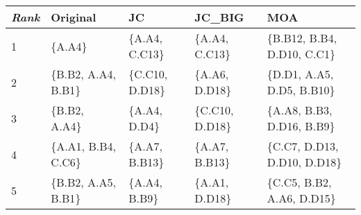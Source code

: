 \begin{tabular}{lllll}
	\toprule
	\textit{Rank} & Original             & JC               & JC\_BIG          & MOA                           \\
	\midrule
	1             & \{A.A4\}             & \{A.A4, C.C13\}  & \{A.A4, C.C13\}  &
	\{B.B12, B.B4, D.D10, C.C1\}                                                                               \\[3pt]
	2             & \{B.B2, A.A4, B.B1\} & \{C.C10, D.D18\} & \{A.A6, D.D18\}  & \{D.D1, A.A5, D.D5, B.B10\}   \\[3pt]
	3             & \{B.B2, A.A4\}       & \{A.A4, D.D4\}   & \{C.C10, D.D18\} & \{A.A8, B.B3, D.D16, B.B9\}   \\[3pt]
	4             & \{A.A1, B.B4, C.C6\} & \{A.A7, B.B13\}  & \{A.A7, B.B13\}  & \{C.C7, D.D13, D.D10, D.D18\} \\[3pt]
	5             & \{B.B2, A.A5, B.B1\} & \{A.A4, B.B9\}   & \{A.A1, D.D18\}  & \{C.C5, B.B2, A.A6, D.D15\}   \\
	\bottomrule
\end{tabular}

